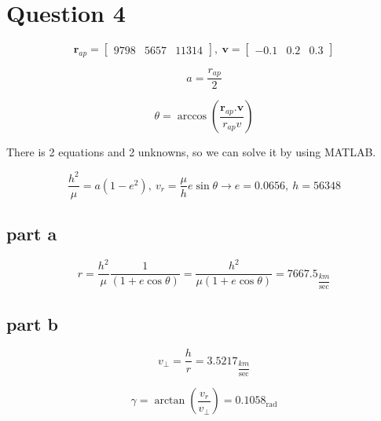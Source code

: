 \section{Question 4}

$$
\boldsymbol{r}_{ap}=\begin{bmatrix}
    9798 &
    5657 &
    11314
\end{bmatrix}, ~ 
\boldsymbol{v}=\begin{bmatrix}
    -0.1 &
    0.2 &
    0.3
\end{bmatrix}
$$

$$
a = \dfrac{r_{ap}}{2}
$$

$$
\theta = \arccos\left(\dfrac{\boldsymbol{r}_{ap}.\boldsymbol{v}}{r_{ap}v}\right)
$$

There is 2 equations and 2 unknowns, so we can solve it by using MATLAB.

$$
\dfrac{h^2}{\mu} = a(1-e^2),~ v_r = \dfrac{\mu}{h}e\sin\theta \to e = 0.0656,~ h = 56348
$$

\subsection{part a}

$$
r = \dfrac{h^2}{\mu}\dfrac{1}{(1+e\cos\theta)} = \dfrac{h^2}{\mu(1+e\cos\theta)} = 7667.5_{\dfrac{km}{\sec}}
$$

\subsection{part b}

$$
v_{\perp} = \dfrac{h}{r} = 3.5217_{\dfrac{km}{\sec}}
$$

$$
\gamma = \arctan\left(\dfrac{v_r}{v_{\perp}}\right) = 0.1058
_{\text{rad}}
$$





